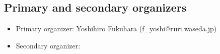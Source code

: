 \documentclass{article}
\newcommand{\cYoshi}[1]{{\color{cyan}{#1}}} %
\begin{document}
\begin{enumerate}

\end{enumerate}

\subsection{Primary and secondary organizers}
\begin{itemize}
    \item Primary organizer: Yoshihiro Fukuhara (f\_yoshi@ruri.waseda.jp)
    \item Secondary organizer: \cYoshi{TBD}
\end{itemize}
\end{document}
